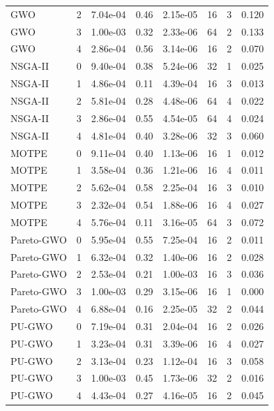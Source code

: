 \begin{table}[t]
\begin{tabular}{lccccccc}
GWO & 2 & 7.04e-04 & 0.46 & 2.15e-05 & 16 & 3 & 0.120 \\
GWO & 3 & 1.00e-03 & 0.32 & 2.33e-06 & 64 & 2 & 0.133 \\
GWO & 4 & 2.86e-04 & 0.56 & 3.14e-06 & 16 & 2 & 0.070 \\
NSGA-II & 0 & 9.40e-04 & 0.38 & 5.24e-06 & 32 & 1 & 0.025 \\
NSGA-II & 1 & 4.86e-04 & 0.11 & 4.39e-04 & 16 & 3 & 0.013 \\
NSGA-II & 2 & 5.81e-04 & 0.28 & 4.48e-06 & 64 & 4 & 0.022 \\
NSGA-II & 3 & 2.86e-04 & 0.55 & 4.54e-05 & 64 & 4 & 0.024 \\
NSGA-II & 4 & 4.81e-04 & 0.40 & 3.28e-06 & 32 & 3 & 0.060 \\
MOTPE & 0 & 9.11e-04 & 0.40 & 1.13e-06 & 16 & 1 & 0.012 \\
MOTPE & 1 & 3.58e-04 & 0.36 & 1.21e-06 & 16 & 4 & 0.011 \\
MOTPE & 2 & 5.62e-04 & 0.58 & 2.25e-04 & 16 & 3 & 0.010 \\
MOTPE & 3 & 2.32e-04 & 0.54 & 1.88e-06 & 16 & 4 & 0.027 \\
MOTPE & 4 & 5.76e-04 & 0.11 & 3.16e-05 & 64 & 3 & 0.072 \\
Pareto-GWO & 0 & 5.95e-04 & 0.55 & 7.25e-04 & 16 & 2 & 0.011 \\
Pareto-GWO & 1 & 6.32e-04 & 0.32 & 1.40e-06 & 16 & 2 & 0.028 \\
Pareto-GWO & 2 & 2.53e-04 & 0.21 & 1.00e-03 & 16 & 3 & 0.036 \\
Pareto-GWO & 3 & 1.00e-03 & 0.29 & 3.15e-06 & 16 & 1 & 0.000 \\
Pareto-GWO & 4 & 6.88e-04 & 0.16 & 2.25e-05 & 32 & 2 & 0.044 \\
PU-GWO & 0 & 7.19e-04 & 0.31 & 2.04e-04 & 16 & 2 & 0.026 \\
PU-GWO & 1 & 3.23e-04 & 0.31 & 3.39e-06 & 16 & 4 & 0.027 \\
PU-GWO & 2 & 3.13e-04 & 0.23 & 1.12e-04 & 16 & 3 & 0.058 \\
PU-GWO & 3 & 1.00e-03 & 0.45 & 1.73e-06 & 32 & 2 & 0.016 \\
PU-GWO & 4 & 4.43e-04 & 0.27 & 4.16e-05 & 16 & 2 & 0.045 \\
\bottomrule
\end{tabular}
\end{table}
